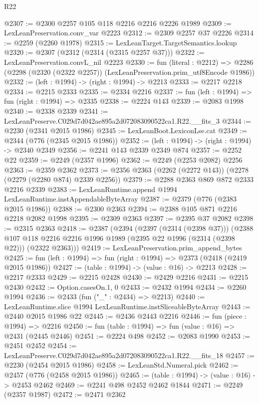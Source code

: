 \begin{lexlean}{R22}
\begin{coremodule}
@2307 := @2300 @2257 @105 @118 @2216 @2216 @2226 @1989
@2309 := LexLeanPreservation.conv_var @2223
@2312 := @2309 @2257 @37 @2226
@2314 := @2259 (@2260 @1978)
@2315 := LexLeanTarget.TargetSemantics.lookup
@2320 := @2307 (@2312 (@2314 (@2315 @2257 @37)))
@2322 := LexLeanPreservation.convL_nil @2223
@2330 := fun (literal : @2212) =>
  @2286 (@2298 (@2320 (@2322 @2257)) (LexLeanPreservation.prim_utf8Encode @1986))
@2332 := (left : @1994) -> (right : @1994) -> @2213
@2333 := @2217 @2218
@2334 := @2215 @2333
@2335 := @2334 @2216
@2337 := fun (left : @1994) => fun (right : @1994) => @2335
@2338 := @2224 @143
@2339 := @2083 @1998
@2340 := @2338 @2339
@2341 := LexLeanPreserve.C029d7d042ae895a2d072083090522ca1.R22.__fits_3
@2344 := @2230 (@2341 @2015 @1986)
@2345 := LexLeanBoot.LexiconLse.cat
@2349 := @2344 (@776 (@2345 @2015 @1986))
@2352 := (left : @1994) -> (right : @1994) -> @2340 @2349
@2356 := @2241 @143 @2339 @2349 @874
@2357 := @2252 @22
@2359 := @2249 (@2357 @1996)
@2362 := @2249 (@2253 @2082) @2256
@2363 := @2359 @2362
@2373 := @2356 @2363 (@2262 (@2272 @143)) (@2278 (@2279 (@2280 @874) @2339 @2256))
@2379 := @2288 @2363 @869 @872 @2333 @2216 @2339
@2383 := LexLeanRuntime.append @1994 LexLeanRuntime.instAppendableByteArray
@2387 := @2379 (@776 (@2383 @2015 @1986))
@2388 := @2300 @2363
@2394 := @2388 @105 @871 @2216 @2218 @2082 @1998
@2395 := @2309 @2363
@2397 := @2395 @37 @2082
@2398 := @2315 @2363
@2418 := @2387
    (@2394
      (@2397 (@2314 (@2398 @37)))
      (@2388 @107 @118 @2216 @2216 @1996 @1989 (@2395 @22 @1996 (@2314 (@2398 @22))) (@2322 @2363)))
@2419 := LexLeanPreservation.prim_append_bytes
@2425 := fun (left : @1994) => fun (right : @1994) => @2373 (@2418 (@2419 @2015 @1986))
@2427 := (table : @1994) -> (value : @16) -> @2213
@2428 := @2217 @2333
@2429 := @2215 @2428
@2430 := @2429 @2216
@2431 := @2215 @2430
@2432 := Option.casesOn.{1, 0}
@2433 := @2432 @1994
@2434 := @2260 @1994
@2436 := @2433 (fun ("_" : @2434) => @2213)
@2440 := LexLeanRuntime.slice @1994 LexLeanRuntime.instSliceableByteArray
@2443 := @2440 @2015 @1986 @22
@2445 := @2436 @2443 @2216
@2446 := fun (piece : @1994) => @2216
@2450 := fun (table : @1994) => fun (value : @16) => @2431 (@2445 @2446)
@2451 := @2224 @498
@2452 := @2083 @1990
@2453 := @2451 @2452
@2454 := LexLeanPreserve.C029d7d042ae895a2d072083090522ca1.R22.__fits_18
@2457 := @2230 (@2454 @2015 @1986)
@2458 := LexLeanStd.Numeral.pick
@2462 := @2457 (@776 (@2458 @2015 @1986))
@2465 := (table : @1994) -> (value : @16) -> @2453 @2462
@2469 := @2241 @498 @2452 @2462 @1844
@2471 := @2249 (@2357 @1987)
@2472 := @2471 @2362

\end{coremodule}
\end{lexlean}
